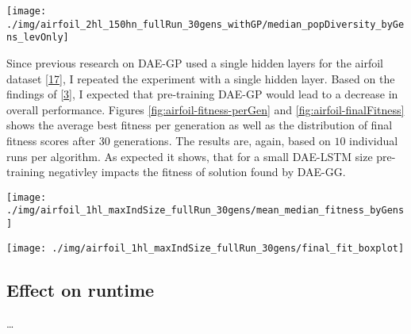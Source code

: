 \documentclass[
  11pt,
]{article}
\let\origfigure\figure
\let\endorigfigure\endfigure
\renewenvironment{figure}[1][2] {
    \expandafter\origfigure\expandafter[H]
} {
    \endorigfigure
}
\begin{document}
\begin{figure}[c]

{\centering \texttt{[image: ./img/airfoil\_2hl\_150hn\_fullRun\_30gens\_withGP/median\_popDiversity\_byGens\_levOnly]} 

}

\caption{Median Population Diversity over 30 Generations - Airfoil (2HL)}\label{fig:airfoil-popDiversity}
\end{figure}

Since previous research on DAE-GP used a single hidden layers for the airfoil dataset {[}\protect\hyperlink{ref-dae-gp_2022_symreg}{17}{]}, I repeated the experiment with a single hidden layer. Based on the findings of {[}\protect\hyperlink{ref-pmlr-v5-erhan09a}{3}{]}, I expected that pre-training DAE-GP would lead to a decrease in overall performance. Figures \ref{fig:airfoil-fitness-perGen} and \ref{fig:airfoil-finalFitness} shows the average best fitness per generation as well as the distribution of final fitness scores after 30 generations. The results are, again, based on \(10\) individual runs per algorithm. As expected it shows, that for a small DAE-LSTM size pre-training negativley impacts the fitness of solution found by DAE-GG.

\begin{figure}[c]

{\centering \texttt{[image: ./img/airfoil\_1hl\_maxIndSize\_fullRun\_30gens/mean\_median\_fitness\_byGens]} 

}

\caption{Fitness over 30 Generations - Airfoil (1HL)}\label{fig:airfoil-fitness-perGen}
\end{figure}

\begin{figure}[c]

{\centering \texttt{[image: ./img/airfoil\_1hl\_maxIndSize\_fullRun\_30gens/final\_fit\_boxplot]} 

}

\caption{Fitness after 30 Generations - Airfoil (1HL)}\label{fig:airfoil-finalFitness}
\end{figure}

\hypertarget{effect-on-runtime}{%
\subsection{Effect on runtime}\label{effect-on-runtime}}

\ldots{}
\end{document}
